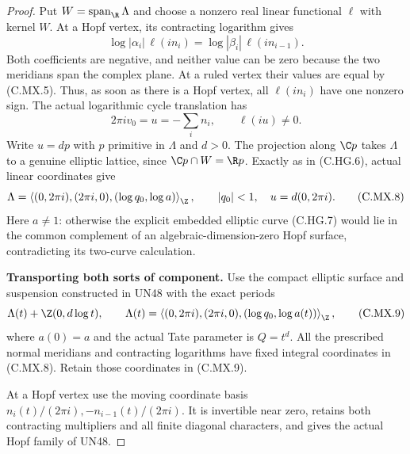 \begin{proof}
Put $W=\operatorname{span}_{\R}\Lambda$ and choose
a nonzero real linear functional $\ell$ with
kernel $W$. At a Hopf vertex, its contracting
logarithm gives
\[
 \log|\alpha_i|\,\ell(i n_i)
        =\log|\beta_i|\,\ell(i n_{i-1}).
                                                        \tag{C.MX.6}
\]
Both coefficients are negative, and neither value
can be zero because the two meridians span the
complex plane. At a ruled vertex their values
are equal by (C.MX.5). Thus, as soon as there is
a Hopf vertex, all $\ell(i n_i)$ have one nonzero
sign. The actual logarithmic cycle translation has
\[
                  2\pi i v_0=u=-\sum_i n_i,\qquad
                              \ell(iu)\ne0 .            \tag{C.MX.7}
\]
Write $u=d p$ with $p$ primitive in $\Lambda$ and
$d>0$. The projection along $\C p$ takes $\Lambda$
to a genuine elliptic lattice, since
$\C p\cap W=\R p$. Exactly as in (C.HG.6), actual
linear coordinates give
\[
 \Lambda=\left\langle
 (0,2\pi i),(2\pi i,0),(\log q_0,\log a)
                     \right\rangle_{\Z},\qquad
              |q_0|<1,\quad u=d(0,2\pi i).             \tag{C.MX.8}
\]
Here $a\ne1$: otherwise the explicit embedded
elliptic curve (C.HG.7) would lie in the common
complement of an algebraic-dimension-zero Hopf
surface, contradicting its two-curve calculation.

\par\medskip\noindent\textbf{Transporting both sorts of component.}
Use the compact elliptic surface and suspension
constructed in UN48 with the exact periods
\[
 \Lambda(t)+\Z(0,d\log t),\qquad
 \Lambda(t)=\left\langle
 (0,2\pi i),(2\pi i,0),(\log q_0,\log a(t))
                         \right\rangle_{\Z},             \tag{C.MX.9}
\]
where $a(0)=a$ and the actual Tate parameter is
$Q=t^d$. All the prescribed normal meridians and
contracting logarithms have fixed integral
coordinates in (C.MX.8). Retain those coordinates
in (C.MX.9).

At a Hopf vertex use the moving coordinate basis
$n_i(t)/(2\pi i),-n_{i-1}(t)/(2\pi i)$.
It is invertible near zero, retains both
contracting multipliers and all finite diagonal
characters, and gives the actual Hopf family
of UN48.


\end{proof}
